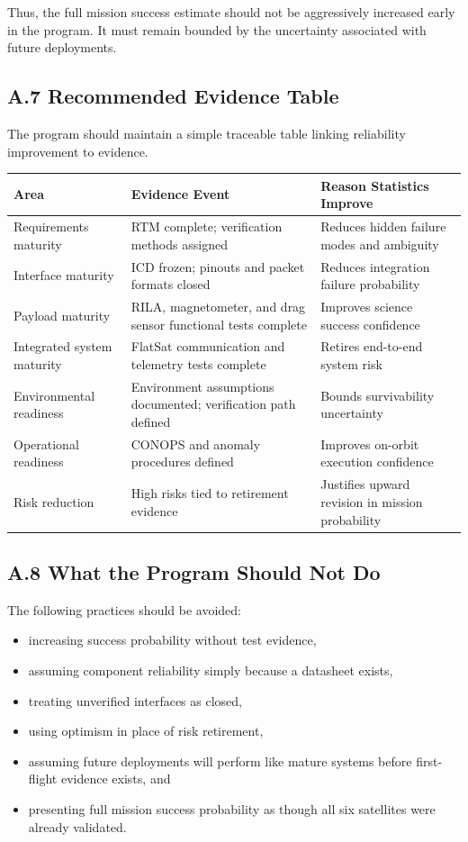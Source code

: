 \documentclass[11pt]{article}
\begin{document}
Thus, the full mission success estimate should not be aggressively increased early in the program.
It must remain bounded by the uncertainty associated with future deployments.

\subsection*{A.7 Recommended Evidence Table}

The program should maintain a simple traceable table linking reliability improvement to evidence.

\begin{center}
\begin{tabular}{|p{4.0cm}|p{4.5cm}|p{5.0cm}|}
\hline
\textbf{Area} & \textbf{Evidence Event} & \textbf{Reason Statistics Improve} \\
\hline
Requirements maturity & RTM complete; verification methods assigned & Reduces hidden failure modes and ambiguity \\
\hline
Interface maturity & ICD frozen; pinouts and packet formats closed & Reduces integration failure probability \\
\hline
Payload maturity & RILA, magnetometer, and drag sensor functional tests complete & Improves science success confidence \\
\hline
Integrated system maturity & FlatSat communication and telemetry tests complete & Retires end-to-end system risk \\
\hline
Environmental readiness & Environment assumptions documented; verification path defined & Bounds survivability uncertainty \\
\hline
Operational readiness & CONOPS and anomaly procedures defined & Improves on-orbit execution confidence \\
\hline
Risk reduction & High risks tied to retirement evidence & Justifies upward revision in mission probability \\
\hline
\end{tabular}
\end{center}

\subsection*{A.8 What the Program Should Not Do}

The following practices should be avoided:

\begin{itemize}
    \item increasing success probability without test evidence,
    \item assuming component reliability simply because a datasheet exists,
    \item treating unverified interfaces as closed,
    \item using optimism in place of risk retirement,
    \item assuming future deployments will perform like mature systems before first-flight evidence exists, and
    \item presenting full mission success probability as though all six satellites were already validated.
\end{itemize}
\end{document}

